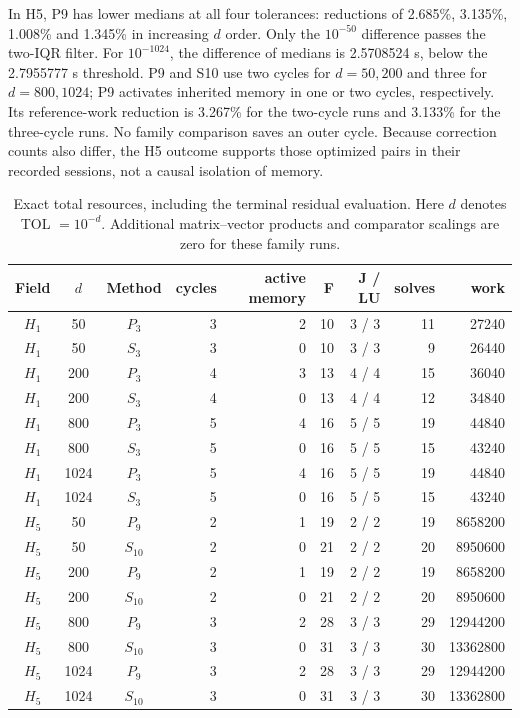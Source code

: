 \documentclass[11pt]{article}
\begin{document}
In H5, P9 has lower medians at all four tolerances: reductions of 2.685\%, 3.135\%, 1.008\% and 1.345\% in increasing $d$ order. Only the $10^{-50}$ difference passes the two-IQR filter. For $10^{-1024}$, the difference of medians is 2.5708524 s, below the 2.7955777 s threshold. P9 and S10 use two cycles for $d=50,200$ and three for $d=800,1024$; P9 activates inherited memory in one or two cycles, respectively. Its reference-work reduction is 3.267\% for the two-cycle runs and 3.133\% for the three-cycle runs. No family comparison saves an outer cycle. Because correction counts also differ, the H5 outcome supports those optimized pairs in their recorded sessions, not a causal isolation of memory.

\begin{table}[htbp]\centering\scriptsize
\caption{Exact total resources, including the terminal residual evaluation. Here $d$ denotes TOL $=10^{-d}$. Additional matrix--vector products and comparator scalings are zero for these family runs.}\label{tab:mp-resources}
\begin{tabular}{cccrrrrrr}\toprule
Field & $d$ & Method & cycles & active memory & F & J / LU & solves & work\\\midrule
$H_{1}$ & 50 & $P_{3}$ & 3 & 2 & 10 & 3 / 3 & 11 & 27240\\
$H_{1}$ & 50 & $S_{3}$ & 3 & 0 & 10 & 3 / 3 & 9 & 26440\\
$H_{1}$ & 200 & $P_{3}$ & 4 & 3 & 13 & 4 / 4 & 15 & 36040\\
$H_{1}$ & 200 & $S_{3}$ & 4 & 0 & 13 & 4 / 4 & 12 & 34840\\
$H_{1}$ & 800 & $P_{3}$ & 5 & 4 & 16 & 5 / 5 & 19 & 44840\\
$H_{1}$ & 800 & $S_{3}$ & 5 & 0 & 16 & 5 / 5 & 15 & 43240\\
$H_{1}$ & 1024 & $P_{3}$ & 5 & 4 & 16 & 5 / 5 & 19 & 44840\\
$H_{1}$ & 1024 & $S_{3}$ & 5 & 0 & 16 & 5 / 5 & 15 & 43240\\
\midrule
$H_{5}$ & 50 & $P_{9}$ & 2 & 1 & 19 & 2 / 2 & 19 & 8658200\\
$H_{5}$ & 50 & $S_{10}$ & 2 & 0 & 21 & 2 / 2 & 20 & 8950600\\
$H_{5}$ & 200 & $P_{9}$ & 2 & 1 & 19 & 2 / 2 & 19 & 8658200\\
$H_{5}$ & 200 & $S_{10}$ & 2 & 0 & 21 & 2 / 2 & 20 & 8950600\\
$H_{5}$ & 800 & $P_{9}$ & 3 & 2 & 28 & 3 / 3 & 29 & 12944200\\
$H_{5}$ & 800 & $S_{10}$ & 3 & 0 & 31 & 3 / 3 & 30 & 13362800\\
$H_{5}$ & 1024 & $P_{9}$ & 3 & 2 & 28 & 3 / 3 & 29 & 12944200\\
$H_{5}$ & 1024 & $S_{10}$ & 3 & 0 & 31 & 3 / 3 & 30 & 13362800\\
\bottomrule\end{tabular}\end{table}
\FloatBarrier
\end{document}
